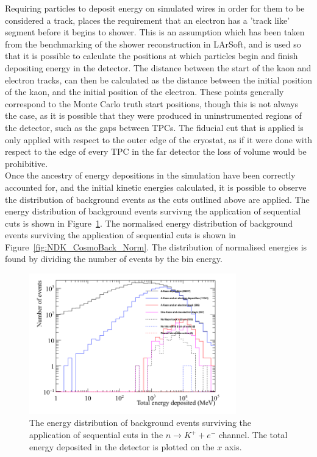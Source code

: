 Requiring particles to deposit energy on simulated wires in order for them to be considered a track, places the requirement that an electron has a 'track like' segment before it begins to shower. This is an assumption which has been taken from the benchmarking of the shower reconstruction in LArSoft, and is used so that it is possible to calculate the positions at which particles begin and finish depositing energy in the detector. The distance between the start of the kaon and electron tracks, can then be calculated as the distance between the initial position of the kaon, and the initial position of the electron. These points generally correspond to the Monte Carlo truth start positions, though this is not always the case, as it is possible that they were produced in uninstrumented regions of the detector, such as the gaps between TPCs. The fiducial cut that is applied is only applied with respect to the outer edge of the cryostat, as if it were done with respect to the edge of every TPC in the far detector the loss of volume would be prohibitive. \\

Once the ancestry of energy depositions in the simulation have been correctly accounted for, and the initial kinetic energies calculated, it is possible to observe the distribution of background events as the cuts outlined above are applied. The energy distribution of background events survivng the application of sequential cuts is shown in Figure~\ref{fig:NDK_CosmoBack_Raw}. The normalised energy distribution of background events surviving the application of sequential cuts is shown in Figure~\ref{fig:NDK_CosmoBack_Norm}. The distribution of normalised energies is found by dividing the number of events by the bin energy. \\

\begin{figure}[h!]
  \centering
  \includegraphics[width=0.8\textwidth]{CosmicBackground_EnergyDepCuts_Raw}
  \caption[The energy distribution of background events surviving the application of sequential cuts in the $n \rightarrow K^{+} + e^{-}$ channel]
          {The energy distribution of background events surviving the application of sequential cuts in the $n \rightarrow K^{+} + e^{-}$ channel. The total energy deposited in the detector is plotted on the $x$ axis.}
  \label{fig:NDK_CosmoBack_Raw}
\end{figure}

